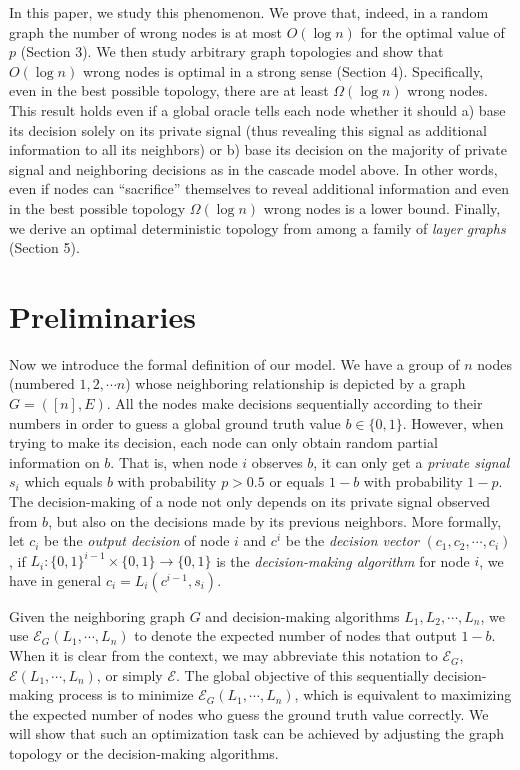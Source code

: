 \documentclass[a4paper,UKenglish]{lipics}
\theoremstyle{definition}
\begin{document}
In this paper, we study this phenomenon. 
We prove that, indeed, in a random graph the number of wrong nodes is at most $O(\log n)$ for the optimal value of $p$ (Section 3). 
We then study arbitrary graph topologies and show that $O(\log n)$ wrong nodes is optimal in a strong sense (Section 4). 
Specifically, even in the best possible topology, there are at least $\Omega(\log n)$ wrong nodes. 
This result holds even if a global oracle tells each node whether it should 
	a) base its decision solely on its private signal (thus revealing this signal as additional information to all its neighbors) or 
	b) base its decision on the majority of private signal and neighboring decisions as in the cascade model above. 
In other words, even if nodes can ``sacrifice'' themselves to reveal additional information 
	and even in the best possible topology $\Omega(\log n)$ wrong nodes is a lower bound. 
Finally, we derive an optimal deterministic topology from among a family of \emph{layer graphs} (Section 5).








\section{Preliminaries}

Now we introduce the formal definition of our model. 
We have a group of $n$ nodes (numbered $1,2,\cdots n$) whose neighboring relationship is depicted by a graph $G = ([n],E)$. 
All the nodes make decisions sequentially according to their numbers in order to guess a global ground truth value $b\in\{0,1\}$. 
However, when trying to make its decision, each node can only obtain random partial information on $b$. 
That is, when node $i$ observes $b$, 
	it can only get a \emph{private signal} $s_i$ which equals $b$ with probability $p>0.5$ or equals $1-b$ with probability $1-p$.  
The decision-making of a node not only depends on its private signal observed from $b$, 
	but also on the decisions made by its previous neighbors. 
More formally, let $c_i$ be the \emph{output decision} of node $i$ and $c^i$ be the \emph{decision vector} $(c_1, c_2, \cdots, c_i)$, 
	if $ L_i : \{0,1\}^{i-1}\times \{0,1\} \to \{0,1\} $ is the \emph{decision-making algorithm} for node $i$,  we have in general $c_i = L_i(c^{i-1}, s_i)$.

Given the neighboring graph $G$ and decision-making algorithms $L_1, L_2, \cdots, L_n$, 
	we use $\mathcal{E}_G(L_1, \dotsb, L_n)$ to denote the expected number of nodes that output $1 - b$. 
When it is clear from the context, we may abbreviate this notation to $\mathcal{E}_G$,
	$\mathcal{E}(L_1, \dotsb, L_n)$, or simply $\mathcal{E}$. 
The global objective of this sequentially decision-making process is to minimize $\mathcal{E}_G(L_1, \dotsb, L_n)$, 
	which is equivalent to maximizing the expected number of nodes who guess the ground truth value correctly. 
We will show that such an optimization task can be achieved by adjusting the graph topology or the decision-making algorithms. 
\end{document}
